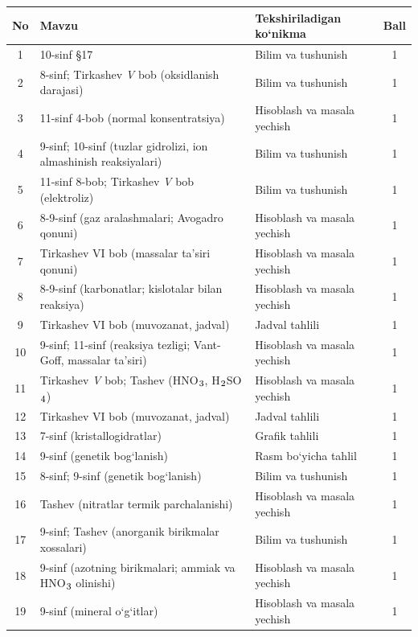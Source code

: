 \documentclass[11pt,a4paper]{article}
\renewcommand{\textsubscript}[1]{\ensuremath{_{\text{\fontsize{8}{8}\selectfont #1}}}}
\begin{document}
{\small\noindent\begin{longtable}{|c|p{7.2cm}|p{5.4cm}|c|}\hline \textbf{No} & \textbf{Mavzu} & \textbf{Tekshiriladigan ko`nikma} & \textbf{Ball}\\\hline
1 & 10-sinf \S{}17 & Bilim va tushunish & 1\\\hline
2 & 8-sinf; Tirkashev \textit{V} bob (oksidlanish darajasi) & Bilim va tushunish & 1\\\hline
3 & 11-sinf 4-bob (normal konsentratsiya) & Hisoblash va masala yechish & 1\\\hline
4 & 9-sinf; 10-sinf (tuzlar gidrolizi, ion almashinish reaksiyalari) & Bilim va tushunish & 1\\\hline
5 & 11-sinf 8-bob; Tirkashev \textit{V} bob (elektroliz) & Bilim va tushunish & 1\\\hline
6 & 8-9-sinf (gaz aralashmalari; Avogadro qonuni) & Hisoblash va masala yechish & 1\\\hline
7 & Tirkashev VI bob (massalar ta'siri qonuni) & Hisoblash va masala yechish & 1\\\hline
8 & 8-9-sinf (karbonatlar; kislotalar bilan reaksiya) & Hisoblash va masala yechish & 1\\\hline
9 & Tirkashev VI bob (muvozanat, jadval) & Jadval tahlili & 1\\\hline
10 & 9-sinf; 11-sinf (reaksiya tezligi; Vant-Goff, massalar ta'siri) & Hisoblash va masala yechish & 1\\\hline
11 & Tirkashev \textit{V} bob; Tashev (HNO\textsubscript{3}, H\textsubscript{2}SO\textsubscript{4}) & Hisoblash va masala yechish & 1\\\hline
12 & Tirkashev VI bob (muvozanat, jadval) & Jadval tahlili & 1\\\hline
13 & 7-sinf (kristallogidratlar) & Grafik tahlili & 1\\\hline
14 & 9-sinf (genetik bog`lanish) & Rasm bo`yicha tahlil & 1\\\hline
15 & 8-sinf; 9-sinf (genetik bog`lanish) & Bilim va tushunish & 1\\\hline
16 & Tashev (nitratlar termik parchalanishi) & Hisoblash va masala yechish & 1\\\hline
17 & 9-sinf; Tashev (anorganik birikmalar xossalari) & Bilim va tushunish & 1\\\hline
18 & 9-sinf (azotning birikmalari; ammiak va HNO\textsubscript{3} olinishi) & Hisoblash va masala yechish & 1\\\hline
19 & 9-sinf (mineral o`g`itlar) & Hisoblash va masala yechish & 1\\\hline

\end{longtable}}
\end{document}
